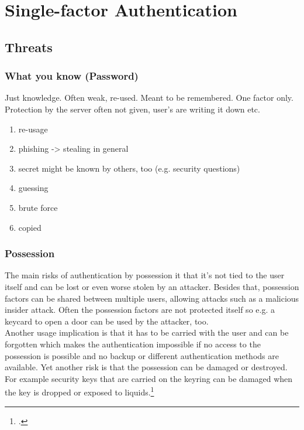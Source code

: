 \chapter{Single-factor Authentication}


\section{Threats}
\label{one-factor-threats}

\subsection{What you know (Password)}

Just knowledge. Often weak, re-used. Meant to be remembered. One factor only.\\
Protection by the server often not given, user's are writing it down etc.

\begin{enumerate}
	\item re-usage
	\item phishing -> stealing in general
	\item secret might be known by others, too (e.g. security questions)
	\item guessing
	\item brute force
	\item copied
\end{enumerate}

\subsection{Possession}

The main risks of authentication by possession it that it's not tied to the user itself and can be lost or even worse stolen by an attacker. Besides that, possession factors can be shared between multiple users, allowing attacks such as a malicious insider attack. Often the possession factors are not protected itself so e.g. a keycard to open a door can be used by the attacker, too.\\
Another usage implication is that it has to be carried with the user and can be forgotten which makes the authentication impossible if no access to the possession is possible and no backup or different authentication methods are available. Yet another risk is that the possession can be damaged or destroyed. For example security keys that are carried on the keyring can be damaged when the key is dropped or exposed to liquids.\footcites[See][263--264]{shostack2014threat}

